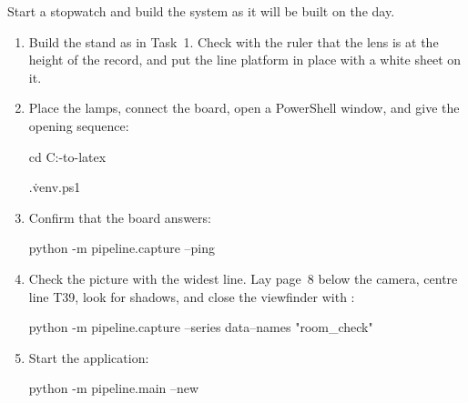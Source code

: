 \label{st:setup6}
Start a stopwatch and build the system as it will be built on the day.
\begin{enumerate}
\item Build the stand as in Task~1. Check with the ruler that the lens is at the height of the
  record, and put the line platform in place with a white sheet on it.
\item Place the lamps, connect the board, open a PowerShell window, and give the opening
  sequence:
\begin{ps}
cd C:\camera-to-latex
\end{ps}
\begin{ps}
.\.venv\Scripts\Activate.ps1
\end{ps}
\item Confirm that the board answers:
\begin{ps}
python -m pipeline.capture --ping
\end{ps}
\item Check the picture with the widest line. Lay page~8 below the camera, centre line T39,
  look for shadows, and close the viewfinder with :
\begin{ps}
python -m pipeline.capture --series data\raw\rig --names "room_check"
\end{ps}
\item Start the application:
\begin{ps}
python -m pipeline.main --new
\end{ps}
\end{enumerate}

